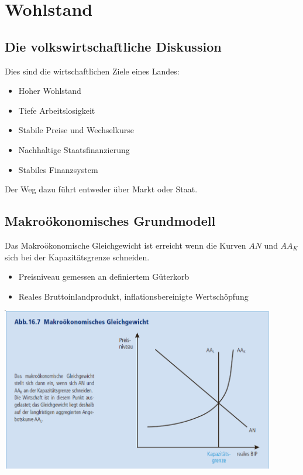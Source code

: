 \section{Wohlstand}
\subsection{Die volkswirtschaftliche Diskussion}
Dies sind die wirtschaftlichen Ziele eines Landes:
\begin{itemize}
	\item Hoher Wohlstand
	\item Tiefe Arbeitslosigkeit
	\item Stabile Preise und Wechselkurse
	\item Nachhaltige Staatsfinanzierung
	\item Stabiles Finanzsystem
\end{itemize}
Der Weg dazu führt entweder über Markt oder Staat.
\subsection{Makroökonomisches Grundmodell}
\begin{minipage}{7cm}
Das Makroökonomische Gleichgewicht ist erreicht wenn die Kurven $AN$ und $AA_K$ sich bei der Kapazitätsgrenze schneiden. 
\begin{itemize}
	\item Preisniveau gemessen an definiertem Güterkorb
	\item Reales Bruttoinlandprodukt, inflationsbereinigte Wertschöpfung
\end{itemize}
\end{minipage}
\begin{minipage}{12cm}
		\includegraphics[width=12cm]{images/makro.png}
\end{minipage}


